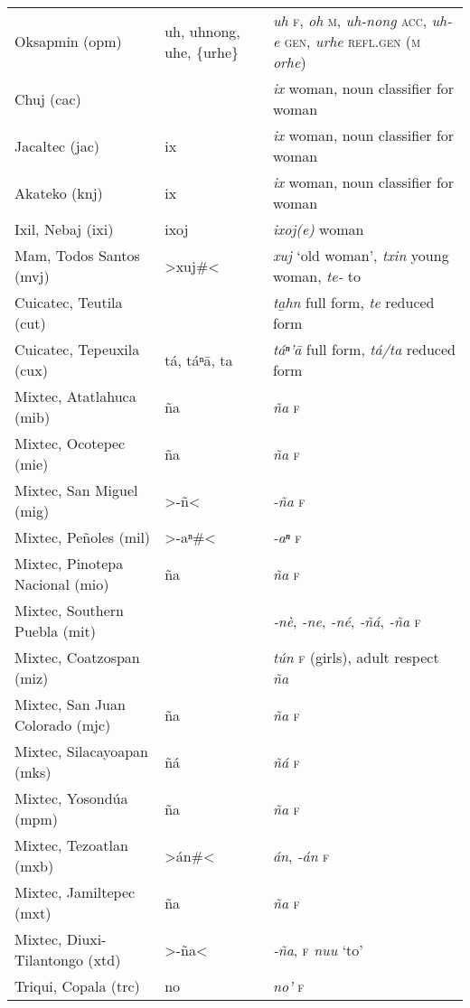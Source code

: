 \begin{longtable}{L{.25\textwidth}L{.25\textwidth}L{.5\textwidth}}
Oksapmin (opm)	&	uh, uhnong, uhe, \{urhe\}	&	\textit{uh} \textsc{f}, \textit{oh} \textsc{m}, \textit{uh-nong} \textsc{acc}, \textit{uh-e} \textsc{gen}, \textit{urhe} \textsc{refl.gen} (\textsc{m} \textit{orhe})	\\
Chuj (cac)	&		&	\textit{\textquotesingle{}ix} woman, noun classifier for woman	\\
Jacaltec (jac)	&	ix	&	\textit{ix} woman, noun classifier for woman	\\
Akateko (knj)	&	ix	&	\textit{ix} woman, noun classifier for woman	\\
Ixil, Nebaj (ixi)	&	ixoj	&	\textit{ixoj(e)} woman	\\
Mam, Todos Santos (mvj)	&	>xuj\#<	&	\textit{xuj} ‘old woman’, \textit{txin} young woman, \textit{te-} to	\\
Cuicatec, Teutila (cut)	&		&	\textit{ta̱hn} full form, \textit{te} reduced form	\\
Cuicatec, Tepeuxila (cux)	&	tá, táⁿ\textquotesingle{}ā, ta	&	\textit{táⁿ’ā} full form, \textit{tá/ta} reduced form	\\
Mixtec, Atatlahuca (mib)	&	ña	&	\textit{ña} \textsc{f}	\\
Mixtec, Ocotepec (mie)	&	ña	&	\textit{ña} \textsc{f}	\\
Mixtec, San Miguel (mig)	&	>-ñ<	&	\textit{-ña} \textsc{f}	\\
Mixtec, Peñoles (mil)	&	>-aⁿ\#<	&	\textit{-aⁿ} \textsc{f}	\\
Mixtec, Pinotepa Nacional (mio)	&	ña	&	\textit{ña} \textsc{f}	\\
Mixtec, Southern Puebla (mit)	&		&	\textit{‑nè}, \textit{-ne}, \textit{-né}, \textit{‑ñá}, \textit{-ña} \textsc{f}	\\
Mixtec, Coatzospan (miz)	&		&	\textit{tún} \textsc{f} (girls), adult respect \textit{ña}	\\
Mixtec, San Juan Colorado (mjc)	&	ña	&	\textit{ña} \textsc{f}	\\
Mixtec, Silacayoapan (mks)	&	ñá	&	\textit{ñá} \textsc{f}	\\
Mixtec, Yosondúa (mpm)	&	ña	&	\textit{ña} \textsc{f}	\\
Mixtec, Tezoatlan (mxb)	&	>án\#<	&	\textit{án}, \textit{-án} \textsc{f}	\\
Mixtec, Jamiltepec (mxt)	&	ña	&	\textit{ña} \textsc{f}	\\
Mixtec, Diuxi-Tilantongo (xtd)	&	>-ña<	&	\textit{‑ña}, \textsc{f} \textit{nuu} ‘to’	\\
Triqui, Copala (trc)	&	no\textquotesingle{}	&	\textit{no’} \textsc{f}	\\

\end{longtable}
